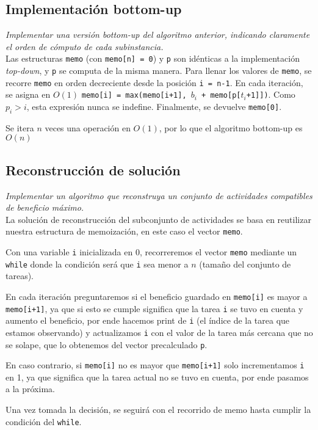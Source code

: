 \documentclass[10pt, a4paper]{article}
\begin{document}
\subsection{Implementación bottom-up}
\emph{Implementar una versión bottom-up del algoritmo anterior, indicando claramente el orden de cómputo de cada subinstancia.} \\

Las estructuras \texttt{memo} (con \texttt{memo[n] = 0}) y \texttt{p} son idénticas a la implementación \emph{top-down}, y \texttt{p} se computa de la misma manera. Para llenar los valores de \texttt{memo}, se recorre \texttt{memo} en orden decreciente desde la posición \texttt{i = n-1}. En cada iteración, se asigna en $O(1)$ \texttt{memo[i] = max(memo[i+1], $b_i$ + memo[p[$t_i$+1]])}. Como $p_i > i$, esta expresión nunca se indefine. Finalmente, se devuelve \texttt{memo[0]}.

Se itera $n$ veces una operación en $O(1)$, por lo que el algoritmo bottom-up es $O(n)$

\subsection{Reconstrucción de solución}
\emph{Implementar un algoritmo que reconstruya un conjunto de actividades compatibles de beneficio máximo.} \\

La solución de reconstrucción del subconjunto de actividades se basa en reutilizar nuestra estructura de memoización, en este caso el vector \texttt{memo}.

Con una variable \texttt{i} inicializada en 0, recorreremos el vector \texttt{memo} mediante un \texttt{while} donde la condición será que \texttt{i} sea menor a $n$ (tamaño del conjunto de tareas).

En cada iteración preguntaremos si el beneficio guardado en \texttt{memo[i]} es mayor a \texttt{memo[i+1]}, ya que si esto se cumple significa que la tarea \texttt{i} se tuvo en cuenta y aumento el beneficio, por ende hacemos print de \texttt{i} (el índice de la tarea que estamos observando) y actualizamos \texttt{i} con el valor de la tarea más cercana que no se solape, que lo obtenemos del vector precalculado \texttt{p}.

En caso contrario, si \texttt{memo[i]} no es mayor que \texttt{memo[i+1]} solo incrementamos \texttt{i} en 1, ya que significa que la tarea actual no se tuvo en cuenta, por ende pasamos a la próxima.

Una vez tomada la decisión, se seguirá con el recorrido de memo hasta cumplir la condición del \texttt{while}.
\end{document}
